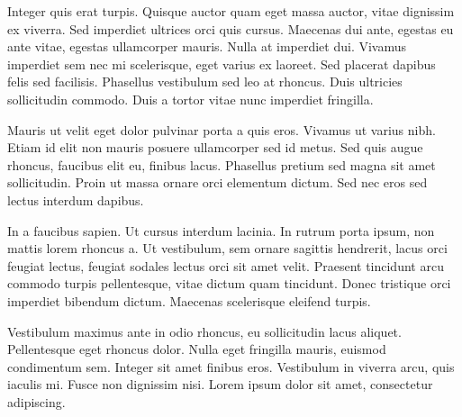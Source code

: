 Integer quis erat turpis. Quisque auctor quam eget massa auctor, vitae dignissim ex viverra. Sed imperdiet ultrices orci quis cursus. Maecenas dui ante, egestas eu ante vitae, egestas ullamcorper mauris. Nulla at imperdiet dui. Vivamus imperdiet sem nec mi scelerisque, eget varius ex laoreet. Sed placerat dapibus felis sed facilisis. Phasellus vestibulum sed leo at rhoncus. Duis ultricies sollicitudin commodo. Duis a tortor vitae nunc imperdiet fringilla.

Mauris ut velit eget dolor pulvinar porta a quis eros. Vivamus ut varius nibh. Etiam id elit non mauris posuere ullamcorper sed id metus. Sed quis augue rhoncus, faucibus elit eu, finibus lacus. Phasellus pretium sed magna sit amet sollicitudin. Proin ut massa ornare orci elementum dictum. Sed nec eros sed lectus interdum dapibus.

In a faucibus sapien. Ut cursus interdum lacinia. In rutrum porta ipsum, non mattis lorem rhoncus a. Ut vestibulum, sem ornare sagittis hendrerit, lacus orci feugiat lectus, feugiat sodales lectus orci sit amet velit. Praesent tincidunt arcu commodo turpis pellentesque, vitae dictum quam tincidunt. Donec tristique orci imperdiet bibendum dictum. Maecenas scelerisque eleifend turpis.

Vestibulum maximus ante in odio rhoncus, eu sollicitudin lacus aliquet. Pellentesque eget rhoncus dolor. Nulla eget fringilla mauris, euismod condimentum sem. Integer sit amet finibus eros. Vestibulum in viverra arcu, quis iaculis mi. Fusce non dignissim nisi. Lorem ipsum dolor sit amet, consectetur adipiscing. 







